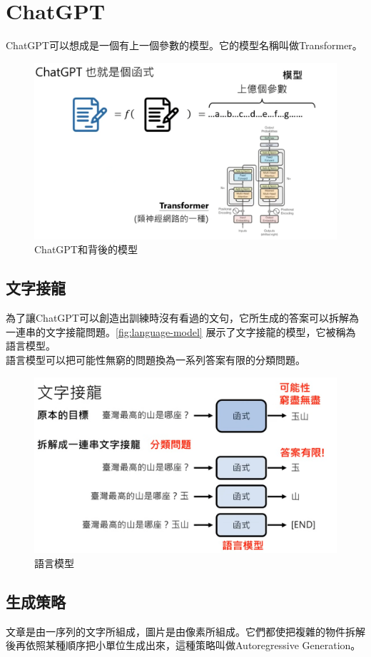 \section{ChatGPT}
ChatGPT可以想成是一個有上一個參數的模型。它的模型名稱叫做Transformer。
\begin{figure}[htbp!]
    \centering
    \includegraphics[width=0.6\linewidth]{images/w4/chatgptTransformer.png}
    \caption{ChatGPT和背後的模型}
    \label{fig:ChatGPT-Transformer}
\end{figure}

\subsection{文字接龍}
為了讓ChatGPT可以創造出訓練時沒有看過的文句，它所生成的答案可以拆解為一連串的文字接龍問題。\autoref{fig:language-model} 展示了文字接龍的模型，它被稱為語言模型。\\
語言模型可以把可能性無窮的問題換為一系列答案有限的分類問題。
\vfill
\begin{figure}[htbp!]
    \centering
    \includegraphics[width=0.6\linewidth]{images/w4/language-model.png}
    \caption{語言模型}
    \label{fig:language-model}
\end{figure}
\vfill
\newpage

\subsection{生成策略}
文章是由一序列的文字所組成，圖片是由像素所組成。它們都使把複雜的物件拆解後再依照某種順序把小單位生成出來，這種策略叫做Autoregressive Generation。

